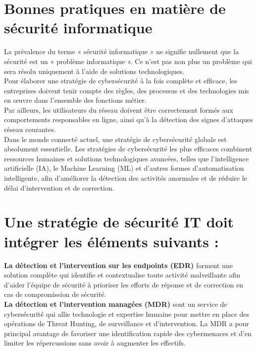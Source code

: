 \section{Bonnes pratiques en matière de sécurité informatique}

La prévalence du terme « sécurité informatique » ne signifie nullement que la sécurité est un « problème informatique ». Ce n’est pas non plus un problème qui sera résolu uniquement à l’aide de solutions technologiques.\\ Pour élaborer une stratégie de cybersécurité à la fois complète et efficace, les entreprises doivent tenir compte des règles, des processus et des technologies mis en œuvre dans l’ensemble des fonctions métier.\\ Par ailleurs, les utilisateurs du réseau doivent être correctement formés aux comportements responsables en ligne, ainsi qu’à la détection des signes d’attaques réseau courantes.\\

Dans le monde connecté actuel, une stratégie de cybersécurité globale est absolument essentielle. Les stratégies de cybersécurité les plus efficaces combinent ressources humaines et solutions technologiques avancées, telles que l’intelligence artificielle (IA), le Machine Learning (ML) et d’autres formes d’automatisation intelligente, afin d’améliorer la détection des activités anormales et de réduire le délai d’intervention et de correction.\\

\section*{\textbf{Une stratégie de sécurité IT doit intégrer les éléments suivants :}}

\textbf{La détection et l’intervention sur les endpoints (EDR)} forment une solution complète qui identifie et contextualise toute activité malveillante afin d’aider l’équipe de sécurité à prioriser les efforts de réponse et de correction en cas de compromission de sécurité.\\

\textbf{La détection et l’intervention managées (MDR)} sont un service de cybersécurité qui allie technologie et expertise humaine pour mettre en place des opérations de Threat Hunting, de surveillance et d’intervention. La MDR a pour principal avantage de favoriser une identification rapide des cybermenaces et d’en limiter les répercussions sans avoir à augmenter les effectifs.\\

